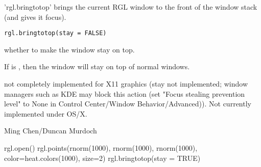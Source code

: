 \begin{Description}\relax
'rgl.bringtotop' brings the current RGL window to the
front of the window stack (and gives it focus).
\end{Description}
\begin{Usage}
\begin{verbatim}
rgl.bringtotop(stay = FALSE)
\end{verbatim}
\end{Usage}
\begin{Arguments}
\begin{ldescription}
\item[\code{stay}] whether to make the window stay on top.
\end{ldescription}
\end{Arguments}
\begin{Details}\relax
If  is , then the window will stay on top
of normal windows.
\end{Details}
\begin{Note}\relax
not completely implemented for X11 graphics (stay not implemented;
window managers such as KDE may block this action
(set "Focus stealing prevention level" to None in Control Center/Window Behavior/Advanced)).
Not currently implemented under OS/X.
\end{Note}
\begin{Author}\relax
Ming Chen/Duncan Murdoch
\end{Author}
\begin{SeeAlso}\relax
{}
\end{SeeAlso}
\begin{Examples}
\begin{ExampleCode}
rgl.open()
rgl.points(rnorm(1000), rnorm(1000), rnorm(1000), color=heat.colors(1000), size=2)
rgl.bringtotop(stay = TRUE)    
\end{ExampleCode}
\end{Examples}


